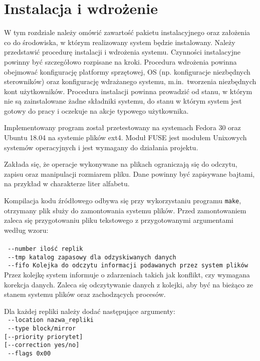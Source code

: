 \chapter{Instalacja i wdrożenie}
\thispagestyle{chapterBeginStyle}

W tym rozdziale należy omówić zawartość pakietu instalacyjnego oraz założenia co do środowiska, w którym realizowany system będzie instalowany. Należy przedstawić procedurę instalacji i wdrożenia systemu. Czynności instalacyjne powinny być szczegółowo rozpisane na kroki. Procedura wdrożenia powinna obejmować konfigurację platformy sprzętowej, OS (np. konfiguracje niezbędnych sterowników) oraz konfigurację wdrażanego systemu, m.in.\ tworzenia niezbędnych kont użytkowników. Procedura instalacji powinna prowadzić od stanu, w którym nie są zainstalowane żadne składniki systemu, do stanu w którym system jest gotowy do pracy i oczekuje na akcje typowego użytkownika.


Implementowany program został przetestowany na systemach Fedora 30 oraz Ubuntu 18.04 na systemie plików ext4. Moduł FUSE jest modułem Unixowych systemów operacyjnych i jest wymagany do działania projektu. 

Zakłada się, że operacje wykonywane na plikach ograniczają się do odczytu, zapisu oraz manipulacji rozmiarem pliku. Dane powinny być zapisywane bajtami, na przykład w charakterze liter alfabetu.

Kompilacja kodu źródłowego odbywa się przy wykorzystaniu programu \verb|make|, otrzymany plik służy do zamontowania systemu plików. Przed zamontowaniem zaleca się przygotowaniu pliku tekstowego z przygotowanymi argumentami według wzoru:
\\
\\
\verb| --number ilość replik| \\
\verb| --tmp katalog zapasowy dla odzyskiwanych danych| \\
\verb| --fifo Kolejka do odczytu informacji podawanych przez system plików| \\
Przez kolejkę system informuje o zdarzeniach takich jak konflikt, czy wymagana korekcja danych. Zaleca się odczytywanie danych z kolejki, aby być na bieżąco ze stanem systemu plików oraz zachodzących procesów. 

Dla każdej repliki należy dodać następujące argumenty:
\\
\verb| --location nazwa_repliki| \\
\verb| --type block/mirror| \\
\verb|[--priority priorytet]| \\
\verb|[--correction yes/no]| \\
\verb| --flags 0x00| \\
\\

